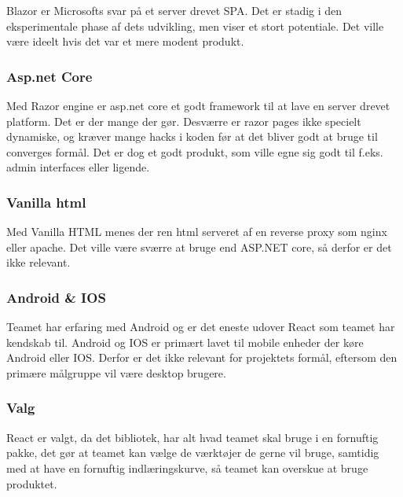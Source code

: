 Blazor er Microsofts svar på et server drevet SPA. Det er stadig i den eksperimentale phase af dets udvikling, men viser et stort potentiale. Det ville være ideelt hvis det var et mere modent produkt.

\subsubsection{Asp.net Core}

Med Razor engine er asp.net core et godt framework til at lave en server drevet platform. Det er der mange der gør. Desværre er razor pages ikke specielt dynamiske, og kræver mange hacks i koden før at det bliver godt at bruge til converges formål. Det er dog et godt produkt, som ville egne sig godt til f.eks. admin interfaces eller ligende.

\subsubsection{Vanilla html}

Med Vanilla HTML menes der ren html serveret af en reverse proxy som nginx eller apache. Det ville være sværre at bruge end ASP.NET core, så derfor er det ikke relevant.

\subsubsection{Android \& IOS}

Teamet har erfaring med Android og er det eneste udover React som teamet har kendskab til. Android og IOS er primært lavet til mobile enheder der køre Android eller IOS. Derfor er det ikke relevant for projektets formål, eftersom den primære målgruppe vil være desktop brugere.

\subsubsection{Valg}

React er valgt, da det bibliotek, har alt hvad teamet skal bruge i en fornuftig pakke, det gør at teamet kan vælge de værktøjer de gerne vil bruge, samtidig med at have en fornuftig indlæringskurve, så teamet kan overskue at bruge produktet.